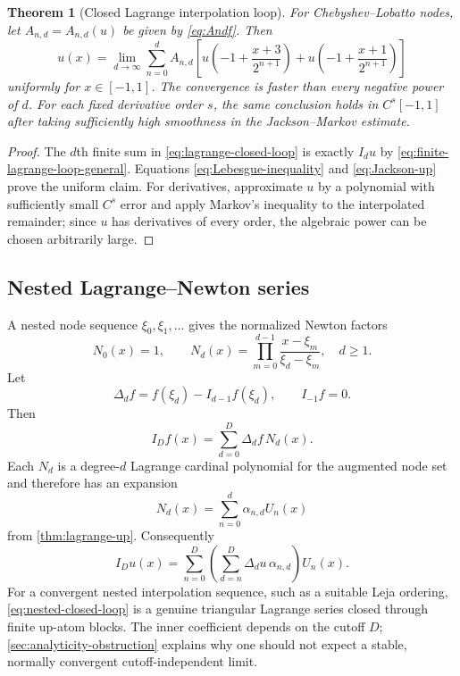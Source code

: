 \documentclass[11pt,oneside]{article}
\newtheorem{theorem}{Theorem}[section]
\theoremstyle{definition}
\theoremstyle{remark}
\begin{document}
\begin{theorem}[Closed Lagrange interpolation loop]
\label{thm:lagrange-loop}
For Chebyshev--Lobatto nodes, let $A_{n,d}=A_{n,d}(u)$ be given by
\eqref{eq:Andf}.  Then
\begin{equation}
 \boxed{
 u(x)=\lim_{d\to\infty}
 \sum_{n=0}^{d}A_{n,d}
 \left[
 u\!\left(-1+\frac{x+3}{2^{n+1}}\right)
 +u\!\left(-1+\frac{x+1}{2^{n+1}}\right)
 \right]}
 \label{eq:lagrange-closed-loop}
\end{equation}
uniformly for $x\in[-1,1]$.  The convergence is faster than every negative
power of $d$.  For each fixed derivative order $s$, the same conclusion
holds in $C^s[-1,1]$ after taking sufficiently high smoothness in the
Jackson--Markov estimate.
\end{theorem}

\begin{proof}
The $d$th finite sum in \eqref{eq:lagrange-closed-loop} is exactly $I_du$ by
\eqref{eq:finite-lagrange-loop-general}.  Equations
\eqref{eq:Lebesgue-inequality} and \eqref{eq:Jackson-up} prove the uniform
claim.  For derivatives, approximate $u$ by a polynomial with sufficiently
small $C^s$ error and apply Markov's inequality to the interpolated remainder;
since $u$ has derivatives of every order, the algebraic power can be chosen
arbitrarily large.
\end{proof}

\subsection{Nested Lagrange--Newton series}
A nested node sequence $\xi_0,\xi_1,\ldots$ gives the normalized Newton
factors
\begin{equation}
 N_0(x)=1,
 \qquad
 N_d(x)=\prod_{m=0}^{d-1}\frac{x-\xi_m}{\xi_d-\xi_m},
 \quad d\ge1.
 \label{eq:Newton-cardinal}
\end{equation}
Let
\begin{equation}
 \Delta_d f=f(\xi_d)-I_{d-1}f(\xi_d),
 \qquad I_{-1}f=0.
 \label{eq:Newton-increment}
\end{equation}
Then
\begin{equation}
 I_Df(x)=\sum_{d=0}^{D}\Delta_df\,N_d(x).
 \label{eq:Newton-series-finite}
\end{equation}
Each $N_d$ is a degree-$d$ Lagrange cardinal polynomial for the augmented
node set and therefore has an expansion
\begin{equation}
 N_d(x)=\sum_{n=0}^{d}\alpha_{n,d}U_n(x)
 \label{eq:Nd-up}
\end{equation}
from \cref{thm:lagrange-up}.  Consequently
\begin{equation}
 I_Du(x)=\sum_{n=0}^{D}
 \left(\sum_{d=n}^{D}\Delta_du\,\alpha_{n,d}\right)U_n(x).
 \label{eq:nested-closed-loop}
\end{equation}
For a convergent nested interpolation sequence, such as a suitable Leja
ordering, \eqref{eq:nested-closed-loop} is a genuine triangular Lagrange
series closed through finite up-atom blocks.  The inner coefficient depends
on the cutoff $D$; \cref{sec:analyticity-obstruction} explains why one should
not expect a stable, normally convergent cutoff-independent limit.
\end{document}
